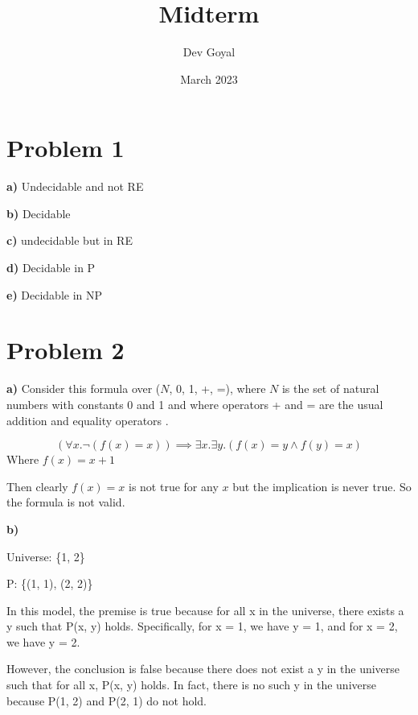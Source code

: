 \documentclass{article}
\title{Midterm}
\author{Dev Goyal }
\date{March 2023}
\begin{document}
\maketitle

\section{Problem 1}

\noindent \textbf{a)} Undecidable and not RE \newline

\noindent \textbf{b)} Decidable \newline

\noindent \textbf{c)} undecidable but in RE\newline

\noindent \textbf{d)} Decidable in P \newline

\noindent \textbf{e)} Decidable in NP \newline

\section{Problem 2}

\noindent \textbf{a)} Consider this formula over ($N$, 0, 1, +, =), where $N$ is the set of natural numbers with constants 0 and 1 and where operators + and = are the usual addition and equality operators . \newline

\begin{equation}
    (\forall x. \neg (f(x) = x)) \implies \exists x. \exists y. (f(x) = y \land f(y) = x)
\end{equation}
Where $f(x) = x + 1$

Then clearly $f(x) = x$ is not true for any $x$ but the implication is never true. So the formula is not valid. \newline

\noindent \textbf{b)} \newline

Universe: \{1, 2\}

P: \{(1, 1), (2, 2)\}

In this model, the premise is true because for all x in the universe, there exists a y such that P(x, y) holds. Specifically, for x = 1, we have y = 1, and for x = 2, we have y = 2.

However, the conclusion is false because there does not exist a y in the universe such that for all x, P(x, y) holds. In fact, there is no such y in the universe because P(1, 2) and P(2, 1) do not hold.
\end{document}
